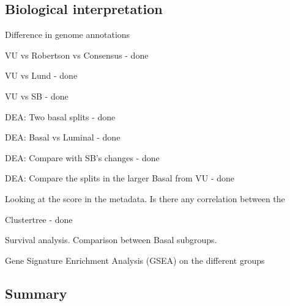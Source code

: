 \subsection{Biological interpretation} \label{s:cs:bio_interp}


\begin{todolist}
    \item Difference in genome annotations
    \item VU vs Robertson vs Consensus - done
    \item VU vs Lund - done
    \item VU vs SB - done
    \item DEA: Two basal splits - done
    \item DEA: Basal vs Luminal - done
    \item DEA: Compare with SB's changes - done
    \item DEA: Compare the splits in the larger Basal from VU - done
    \item Looking at the score in the metadata. Is there any correlation between the 
    \item Clustertree - done
    \item Survival analysis. Comparison between Basal subgroups.
    \item Gene Signature Enrichment Analysis (GSEA) on the different groups 
\end{todolist}


\subsection{Summary}